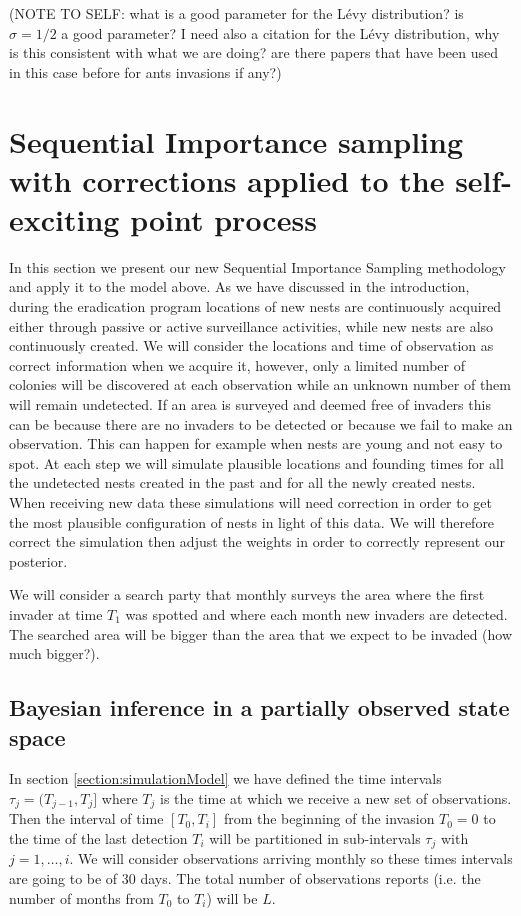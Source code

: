 \documentclass[11pt,a4paper]{article}
\begin{document}
{{(NOTE TO SELF: what is a good parameter for the L\'evy distribution? is $\sigma = 1/2$ a good parameter? I need also a citation for the L\'evy distribution, why is this consistent with what we are doing? are there papers that have been used in this case before for ants invasions if any?)
}


{\color{red}
\section{Sequential Importance sampling with corrections applied to the self-exciting point process} \label{sec:SISMethod}

In this section we present our new Sequential Importance Sampling methodology and apply it to the model above. As we have discussed in the introduction, during the eradication program locations of new nests are continuously acquired either through passive or active surveillance activities, while new nests are also continuously created. We will consider the locations and time of observation as correct information when we acquire it, however, only a limited number of colonies will be discovered at each observation while an unknown number of them will remain undetected. If an area is surveyed and deemed free of invaders this can be because there are no invaders to be detected or because we fail to make an observation. This can happen for example when nests are young and not easy to spot. At each step we will simulate plausible locations and founding times for all the undetected nests created in the past and for all the newly created nests. When receiving new data these simulations will need correction in order to get the most plausible configuration of nests in light of this data. We will therefore correct the simulation then adjust the weights in order to correctly represent our posterior.

We will consider a search party that monthly surveys the area where the first invader at time $T_1$ was spotted and where each month new invaders are detected. The searched area will be bigger than the area that we expect to be invaded (how much bigger?). 

\subsection{Bayesian inference in a partially observed state space} \label{subsec:POS}

In section \ref{section:simulationModel} we have defined the time intervals $\tau_j = (T_{j-1}, T_j]$ where $T_j$ is the time at which we receive a new set of observations. Then the interval of time $[T_0, T_i]$ from the beginning of the invasion $T_0=0$ to the time of the last detection $T_i$ will be partitioned in sub-intervals $\tau_j$ with $j = 1, \dots, i$. We will consider observations arriving monthly so these times intervals are going to be of 30 days. The total number of observations reports (i.e. the number of months from $T_0$ to $T_i$) will be $L$.

}}
\end{document}
